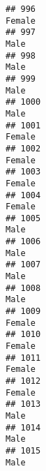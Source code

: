 \documentclass[]{article}
\begin{document}
\begin{verbatim}
## 996                                                                                                                           Female
## 997                                                                                                                             Male
## 998                                                                                                                             Male
## 999                                                                                                                             Male
## 1000                                                                                                                            Male
## 1001                                                                                                                          Female
## 1002                                                                                                                          Female
## 1003                                                                                                                          Female
## 1004                                                                                                                          Female
## 1005                                                                                                                            Male
## 1006                                                                                                                            Male
## 1007                                                                                                                            Male
## 1008                                                                                                                            Male
## 1009                                                                                                                          Female
## 1010                                                                                                                          Female
## 1011                                                                                                                          Female
## 1012                                                                                                                          Female
## 1013                                                                                                                            Male
## 1014                                                                                                                            Male
## 1015                                                                                                                            Male

\end{verbatim}
\end{document}
